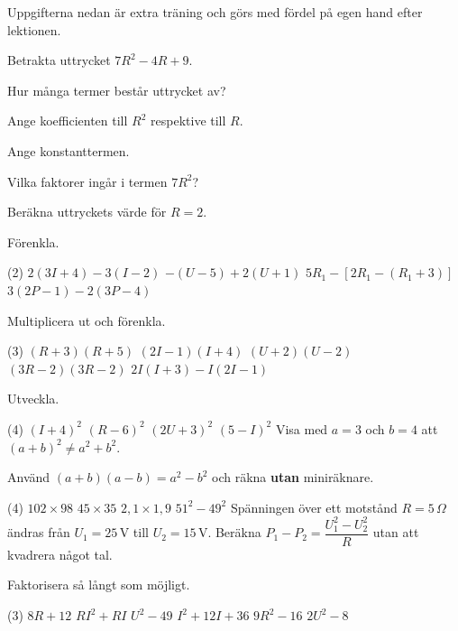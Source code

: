 Uppgifterna nedan är extra träning och görs med fördel på egen hand efter lektionen.

Betrakta uttrycket $7R^2 - 4R + 9$.
\begin{parts}
  \item Hur många termer består uttrycket av?
  \item Ange koefficienten till $R^2$ respektive till $R$.
  \item Ange konstanttermen.
  \item Vilka faktorer ingår i termen $7R^2$?
  \item Beräkna uttryckets värde för $R = 2$.
\end{parts}

Förenkla.
\begin{delar}(2)
  \task $2(3I + 4) - 3(I - 2)$
  \task $-(U - 5) + 2(U + 1)$
  \task $5R_1 - \left[2R_1 - (R_1 + 3)\right]$
  \task $3(2P - 1) - 2(3P - 4)$
\end{delar}

Multiplicera ut och förenkla.
\begin{delar}(3)
  \task $(R + 3)(R + 5)$
  \task $(2I - 1)(I + 4)$
  \task $(U + 2)(U - 2)$
  \task $(3R - 2)(3R - 2)$
  \task $2I(I + 3) - I(2I - 1)$
\end{delar}

Utveckla.
\begin{delar}(4)
  \task $(I + 4)^2$
  \task $(R - 6)^2$
  \task $(2U + 3)^2$
  \task $(5 - I)^2$
  \task* Visa med $a = 3$ och $b = 4$ att $(a + b)^2 \neq a^2 + b^2$.
\end{delar}

Använd $(a + b)(a - b) = a^2 - b^2$ och räkna \textbf{utan} miniräknare.
\begin{delar}(4)
  \task $102 \times 98$
  \task $45 \times 35$
  \task $2{,}1 \times 1{,}9$
  \task $51^2 - 49^2$
  \task* Spänningen över ett motstånd $R = 5\,\Omega$ ändras från $U_1 = 25\,\text{V}$ till
    $U_2 = 15\,\text{V}$. Beräkna $P_1 - P_2 = \dfrac{U_1^2 - U_2^2}{R}$ utan att kvadrera något
    tal.
\end{delar}

Faktorisera så långt som möjligt.
\begin{delar}(3)
  \task $8R + 12$
  \task $RI^2 + RI$
  \task $U^2 - 49$
  \task $I^2 + 12I + 36$
  \task $9R^2 - 16$
  \task $2U^2 - 8$
\end{delar}

